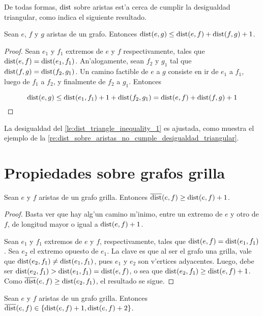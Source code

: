De todas formas, $\textnormal{dist}$ sobre aristas est'a cerca de cumplir la desigualdad triangular, como indica el siguiente resultado.

\begin{lemma}
\label{le:dist_triangle_inequality_1}
Sean $e$, $f$ y $g$ aristas de un grafo. Entonces $\textnormal{dist}(e, g) \leq \textnormal{dist}(e, f) + \textnormal{dist}(f, g) + 1$.

\begin{proof}
Sean $e_1$ y $f_1$ extremos de $e$ y $f$ respectivamente, tales que $\textnormal{dist}(e, f) = \textnormal{dist}(e_1, f_1)$. An'alogamente, sean $f_2$ y $g_1$ tal que $\textnormal{dist}(f, g) = \textnormal{dist}(f_2, g_1)$. Un camino factible de $e$ a $g$ consiste en ir de $e_1$ a $f_1$, luego de $f_1$ a $f_2$, y finalmente de $f_2$ a $g_1$. Entonces

\[\textnormal{dist}(e, g) \leq \textnormal{dist}(e_1, f_1) + 1 + \textnormal{dist}(f_2, g_1) = \textnormal{dist}(e, f) + \textnormal{dist}(f, g) + 1\]
\end{proof}
\end{lemma}

\noindent
La desigualdad del \autoref{le:dist_triangle_inequality_1} es ajustada, como muestra el ejemplo de la \autoref{re:dist_sobre_aristas_no_cumple_desigualdad_triangular}.

\section{Propiedades sobre grafos grilla}

\begin{lemma}
\label{le:distmax_geq_dist_plus_1}
Sean $e$ y $f$ aristas de un grafo grilla. Entonces $\overline{\textnormal{dist}}(e, f) \geq \textnormal{dist}(e, f) + 1$.

\begin{proof}
Basta ver que hay alg'un camino m'inimo, entre un extremo de $e$ y otro de $f$, de longitud mayor o igual a $\textnormal{dist}(e, f) + 1$.

Sean $e_1$ y $f_1$ extremos de $e$ y $f$, respectivamente, tales que $\textnormal{dist}(e, f) = \textnormal{dist}(e_1, f_1)$. Sea $e_2$ el extremo opuesto de $e_1$. La clave es que al ser el grafo una grilla, vale que $\textnormal{dist}(e_2, f_1) \neq \textnormal{dist}(e_1, f_1)$, pues $e_1$ y $e_2$ son v'ertices adyacentes. Luego, debe ser $\textnormal{dist}(e_2, f_1) > \textnormal{dist}(e_1, f_1) = \textnormal{dist}(e, f)$, o sea que $\textnormal{dist}(e_2, f_1) \geq \textnormal{dist}(e, f) + 1$. Como $\overline{\textnormal{dist}}(e, f) \geq \textnormal{dist}(e_2, f_1)$, el resultado se sigue.
\end{proof}
\end{lemma}

\begin{corollary}
\label{co:distmax_dist}
Sean $e$ y $f$ aristas de un grafo grilla. Entonces $\overline{\textnormal{dist}}(e, f) \in \{\textnormal{dist}(e, f) + 1, \textnormal{dist}(e, f) + 2\}$.
\end{corollary}

